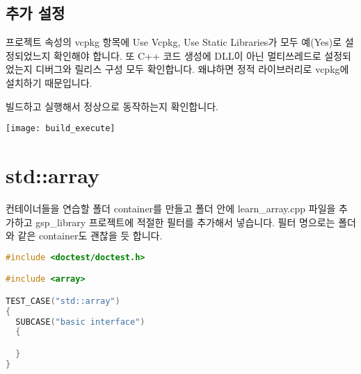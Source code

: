 \subsection{추가 설정}

프로젝트 속성의 vcpkg 항목에 Use Vcpkg, Use Static Libraries가 모두 예(Yes)로 설정되었느지 
확인해야 합니다. 또 C++ \textrightarrow 코드 생성에 DLL이 아닌 멀티쓰레드로 설정되었는지 
디버그와 릴리스 구성 모두 확인합니다. 왜냐하면 정적 라이브러리로 vcpkg에 설치하기 
때문입니다. 

빌드하고 실행해서 정상으로 동작하는지 확인합니다. 

\texttt{[image: build\_execute]}

\section{std::array}

컨테이너들을 연습할 폴더 container를 만들고 폴더 안에 learn\_array.cpp 파일을 
추가하고 gsp\_library 프로젝트에 적절한 필터를 추가해서 넣습니다. 필터 명으로는 
폴더와 같은 container도 괜찮을 듯 합니다. 

\begin{lstlisting}[language=c++, caption={시작 골격}]
#include <doctest/doctest.h>

#include <array>

TEST_CASE("std::array")
{
  SUBCASE("basic interface")
  {

  }
}
\end{lstlisting}



